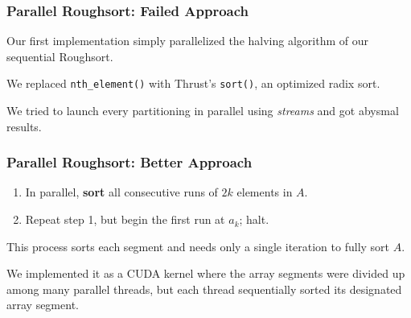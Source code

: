 \documentclass[10pt, xcolor={dvipsnames}, aspectratio=169]{beamer}
\begin{document}
\begin{frame}
\frametitle{}
\end{frame}

\begin{frame}
\frametitle{}
\end{frame}

\begin{frame}
\frametitle{}
\end{frame}

\begin{frame}
\frametitle{}
\end{frame}

\begin{frame}
\frametitle{}
\end{frame}

\begin{frame}
\frametitle{}
\end{frame}

\begin{frame}
\frametitle{Parallel Roughsort: Failed Approach}
Our first implementation simply parallelized the halving algorithm of our sequential Roughsort. \newline

We replaced \texttt{nth_element()} with Thrust's \texttt{sort()}, an optimized radix sort. \newline

We tried to launch every partitioning in parallel using \textit{streams} and got abysmal results.
\end{frame}

\begin{frame}
\frametitle{Parallel Roughsort: Better Approach}
\begin{enumerate}\setlength{\itemsep}{0pt}\setlength{\parskip}{0pt}
\item In parallel, \textbf{sort} all consecutive runs of $2k$ elements in $A$.
\item Repeat step 1, but begin the first run at $a_k$; halt.
\end{enumerate}
This process sorts each segment and needs only a single iteration to fully sort $A$. \newline

We implemented it as a CUDA kernel where the array segments were divided up among many parallel threads,
  but each thread sequentially sorted its designated array segment.
\end{frame}
\end{document}
